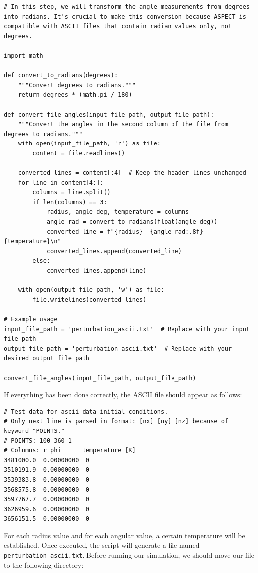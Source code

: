 \documentclass{article}
\begin{document}
\begin{verbatim}
# In this step, we will transform the angle measurements from degrees into radians. It's crucial to make this conversion because ASPECT is compatible with ASCII files that contain radian values only, not degrees.

import math

def convert_to_radians(degrees):
    """Convert degrees to radians."""
    return degrees * (math.pi / 180)

def convert_file_angles(input_file_path, output_file_path):
    """Convert the angles in the second column of the file from degrees to radians."""
    with open(input_file_path, 'r') as file:
        content = file.readlines()

    converted_lines = content[:4]  # Keep the header lines unchanged
    for line in content[4:]:
        columns = line.split()
        if len(columns) == 3:
            radius, angle_deg, temperature = columns
            angle_rad = convert_to_radians(float(angle_deg))
            converted_line = f"{radius}  {angle_rad:.8f}  {temperature}\n"
            converted_lines.append(converted_line)
        else:
            converted_lines.append(line)

    with open(output_file_path, 'w') as file:
        file.writelines(converted_lines)

# Example usage
input_file_path = 'perturbation_ascii.txt'  # Replace with your input file path
output_file_path = 'perturbation_ascii.txt'  # Replace with your desired output file path

convert_file_angles(input_file_path, output_file_path)

\end{verbatim}

If everything has been done correctly, the ASCII file should appear as follows:

\begin{verbatim}
# Test data for ascii data initial conditions.
# Only next line is parsed in format: [nx] [ny] [nz] because of keyword "POINTS:"
# POINTS: 100 360 1
# Columns: r phi      temperature [K]
3481000.0  0.00000000  0
3510191.9  0.00000000  0
3539383.8  0.00000000  0
3568575.8  0.00000000  0
3597767.7  0.00000000  0
3626959.6  0.00000000  0
3656151.5  0.00000000  0
\end{verbatim}

For each radius value and for each angular value, a certain temperature will be established.
Once executed, the script will generate a file named \texttt{perturbation\_ascii.txt}. Before running our simulation, we should move our file to the following directory: 
\end{document}
